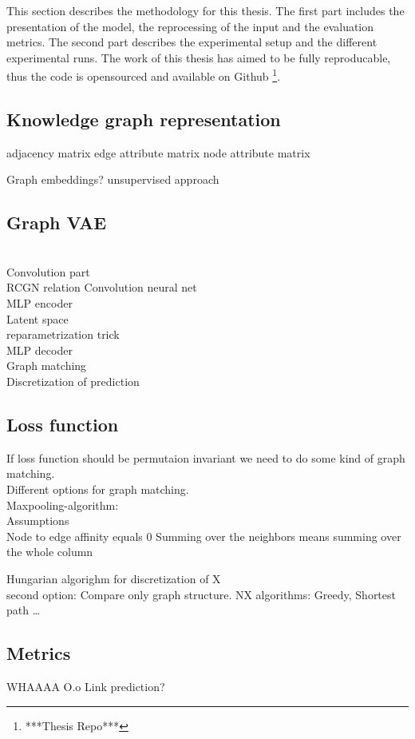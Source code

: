 This section describes the methodology for this thesis. The first part includes the presentation of the model, the reprocessing of the input and the evaluation metrics. The second part describes the experimental setup and the different experimental runs. The work of this thesis has aimed to be fully reproducable, thus the code is opensourced and available on Github \footnote{***Thesis Repo***}.

\subsection{Knowledge graph representation}

adjacency matrix
edge attribute matrix
node attribute matrix

Graph embeddings? unsupervised approach

\subsection{Graph VAE}

\\Convolution part
\\RCGN relation Convolution neural net
\\MLP encoder
\\Latent space
\\reparametrization trick
\\MLP decoder
\\Graph matching
\\Discretization of prediction

\subsection{Loss function}

If loss function should be permutaion invariant we need to do some kind of graph matching.\\
Different options for graph matching.\\
Maxpooling-algorithm:\\
Assumptions\\
Node to edge affinity equals 0
Summing over the neighbors means summing over the whole column

Hungarian algorighm for discretization of X
\\
second option:
Compare only graph structure. 
NX algorithms: Greedy, Shortest path \dots

\subsection{Metrics}

WHAAAA O.o
Link prediction?